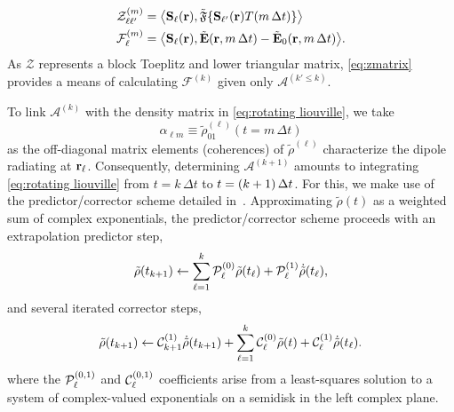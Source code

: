 \begin{subequations}
  \begin{align}
    \mathcal{Z}^{(m)}_{\ell \ell'} &= \big\langle \mathbf{S}_\ell(\vb{r}), \tilde{\mathfrak{F}}\{ \mathbf{S}_{\ell'}(\mathbf{r}) T(m \, \Delta t) \} \big\rangle \\
    \mathcal{F}^{(m)}_\ell &= \big\langle \mathbf{S}_\ell(\vb{r}), \tilde{\mathbf{E}}(\vb{r}, m \, \Delta t) - \tilde{\mathbf{E}}_0(\vb{r}, m \, \Delta t) \big\rangle.
  \end{align}
  \label{eq:projections}
\end{subequations}
As $\mathcal{Z}$ represents a block Toeplitz and lower triangular matrix, \cref{eq:zmatrix} provides a means of calculating $\mathcal{F}^{(k)}$ given only $\mathcal{A}^{(k' \le k)}$.

To link $\mathcal{A}^{(k)}$ with the density matrix in \cref{eq:rotating liouville}, we take
\begin{equation}
  \alpha_{\ell m} \equiv \tilde{\rho}_{01}^{(\ell)}(t = m \, \Delta t)
  \label{eq:polarization definition}
\end{equation}
as the off-diagonal matrix elements (coherences) of $\tilde{\rho}^{(\ell)}$ characterize the dipole radiating at $\vb{r}_\ell$.
Consequently, determining $\mathcal{A}^{(k + 1)}$ amounts to integrating \cref{eq:rotating liouville} from $t = k \, \Delta t$ to $t = \qty(k + 1) \, \Delta t$.
For this, we make use of the predictor/corrector scheme detailed in~\cite{Glaser2009}.
Approximating $\tilde{\rho}(t)$ as a weighted sum of complex exponentials, the predictor/corrector scheme proceeds with an extrapolation predictor step,
\begin{equation}
  \tilde{\rho}(t_{k + 1}) \leftarrow \sum_{\ell = 1}^k \mathcal{P}_\ell^{\qty(0)} \tilde{\rho}(t_\ell) + \mathcal{P}_\ell^{\qty(1)} \dot{\tilde{\rho}}(t_\ell),
  \label{eq:predictor}
\end{equation}
and several iterated corrector steps,
\begin{equation}
  \tilde{\rho}(t_{k + 1}) \leftarrow \mathcal{C}_{k+1}^{\qty(1)} \dot{\tilde{\rho}}(t_{k + 1}) + \sum_{\ell = 1}^k \mathcal{C}_\ell^{\qty(0)} \tilde{\rho}(t) + \mathcal{C}_\ell^{\qty(1)} \dot{\tilde{\rho}}(t_\ell).
  \label{eq:corrector}
\end{equation}
where the $\mathcal{P}_\ell^{\qty(0, 1)}$ and $\mathcal{C}_\ell^{\qty(0, 1)}$ coefficients arise from a least-squares solution to a system of complex-valued exponentials on a semidisk in the left complex plane.
